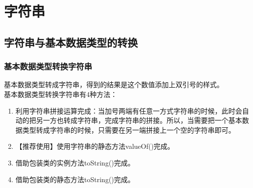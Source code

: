 \chapter{字符串}

\section{字符串与基本数据类型的转换}

\subsection{基本数据类型转换字符串}

基本数据类型转成字符串，得到的结果是这个数值添加上双引号的样式。 \\

基本数据类型转换字符串有4种方法：

\begin{enumerate}
    \item 利用字符串拼接运算完成：当加号两端有任意一方式字符串的时候，此时会自动的把另一方也转成字符串，完成字符串的拼接。所以，当需要把一个基本数据类型转成字符串的时候，只需要在另一端拼接上一个空的字符串即可。
    
    \item 【推荐使用】使用字符串的静态方法valueOf()完成。
    
    \item 借助包装类的实例方法toString()完成。
    
    \item 借助包装类的静态方法toString()完成。
\end{enumerate}


